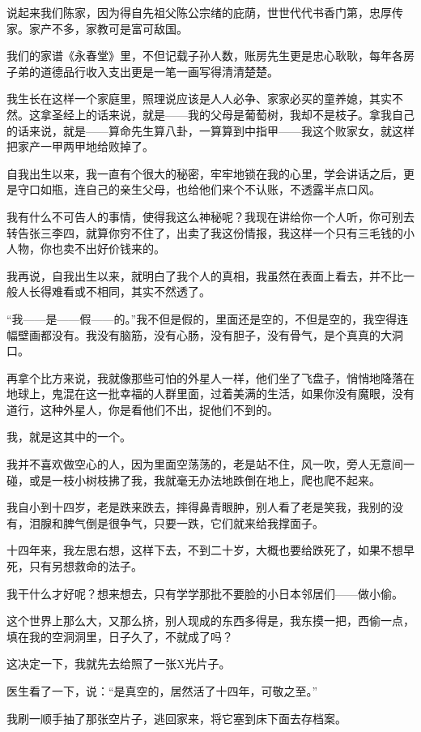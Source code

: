 \par 说起来我们陈家，因为得自先祖父陈公宗绪的庇荫，世世代代书香门第，忠厚传家。家产不多，家教可是富可敌国。
\par 我们的家谱《永春堂》里，不但记载子孙人数，账房先生更是忠心耿耿，每年各房子弟的道德品行收入支出更是一笔一画写得清清楚楚。
\par 我生长在这样一个家庭里，照理说应该是人人必争、家家必买的童养媳，其实不然。这拿圣经上的话来说，就是——我的父母是葡萄树，我却不是枝子。拿我自己的话来说，就是——算命先生算八卦，一算算到中指甲——我这个败家女，就这样把家产一甲两甲地给败掉了。
\par 自我出生以来，我一直有个很大的秘密，牢牢地锁在我的心里，学会讲话之后，更是守口如瓶，连自己的亲生父母，也给他们来个不认账，不透露半点口风。
\par 我有什么不可告人的事情，使得我这么神秘呢？我现在讲给你一个人听，你可别去转告张三李四，就算你穷不住了，出卖了我这份情报，我这样一个只有三毛钱的小人物，你也卖不出好价钱来的。
\par 我再说，自我出生以来，就明白了我个人的真相，我虽然在表面上看去，并不比一般人长得难看或不相同，其实不然透了。
\par “我——是——假——的。”我不但是假的，里面还是空的，不但是空的，我空得连幅壁画都没有。我没有脑筋，没有心肠，没有胆子，没有骨气，是个真真的大洞口。
\par 再拿个比方来说，我就像那些可怕的外星人一样，他们坐了飞盘子，悄悄地降落在地球上，鬼混在这一批幸福的人群里面，过着美满的生活，如果你没有魔眼，没有道行，这种外星人，你是看他们不出，捉他们不到的。
\par 我，就是这其中的一个。
\par 我并不喜欢做空心的人，因为里面空荡荡的，老是站不住，风一吹，旁人无意间一碰，或是一枝小树枝拂了我，我就毫无办法地跌倒在地上，爬也爬不起来。
\par 我自小到十四岁，老是跌来跌去，摔得鼻青眼肿，别人看了老是笑我，我别的没有，泪腺和脾气倒是很争气，只要一跌，它们就来给我撑面子。
\par 十四年来，我左思右想，这样下去，不到二十岁，大概也要给跌死了，如果不想早死，只有另想救命的法子。
\par 我干什么才好呢？想来想去，只有学学那批不要脸的小日本邻居们——做小偷。
\par 这个世界上那么大，又那么挤，别人现成的东西多得是，我东摸一把，西偷一点，填在我的空洞洞里，日子久了，不就成了吗？
\par 这决定一下，我就先去给照了一张X光片子。
\par 医生看了一下，说：“是真空的，居然活了十四年，可敬之至。”
\par 我刷一顺手抽了那张空片子，逃回家来，将它塞到床下面去存档案。
